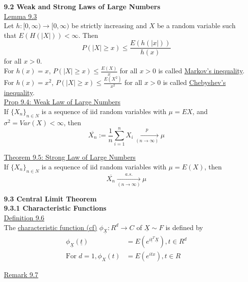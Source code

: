 \documentclass[10pt,letterpaper]{article}
\begin{document}
\pagebreak

\textbf{9.2 Weak and Strong Laws of Large Numbers}\\

\underline{Lemma 9.3}\\

Let $h : [0, \infty)\to[0, \infty)$ be strictly increasing and $X$ be a random variable such that $E(H(|X|))<\infty$. Then $$P(|X|\geq x)\leq\frac{E(h(|x|))}{h(x)}$$ for all $x>0$.\\

For $h(x)=x$, $P(|X|\geq x)\leq\frac{E(X)}{x}$ for all $x>0$ is called \underline{Markov's inequality}. For $h(x)=x^2$, $P(|X|\geq x)\leq\frac{E(X^2)}{x^2}$ for all $x>0$ is called \underline{Chebyshev's inequality}.\\

\underline{Prop 9.4: Weak Law of Large Numbers}\\

If $\{X_n\}_{n\in N}$ is a sequence of iid random variables with $\mu=EX$, and $\sigma^2=Var(X)<\infty$, then
				$$\overline{X_n}:=\frac{1}{n}\sum_{i=1}^nX_i\underset{(n\to\infty)}{\overset{p}{\to}}\mu$$

\underline{Theorem 9.5: Strong Law of Large Numbers}\\

If $\{X_n\}_{n\in N}$ is a sequence of iid random variables with $\mu=E(X)$, then $$\overline{X_n}\underset{(n\to\infty)}{\overset{a.s.}{\to}}\mu$$

\pagebreak

\textbf{9.3 Central Limit Theorem}\\

\textbf{9.3.1 Characteristic Functions}\\

\underline{Definition 9.6}\\

The \underline{characteristic function (cf)} $\phi_{\underline{X}} : R^d\to C$ of $\underline{X}\sim F$ is defined by
				\begin{align*}
					\phi_{\underline{X}}(\underline{t})&=E(e^{i\underline{t}^T\underline{X}}), t\in R^d\\
					\mbox{For }d=1, \phi_X(t)&=E(e^{itx}), t\in R
				\end{align*}

\underline{Remark 9.7}\\
\end{document}
